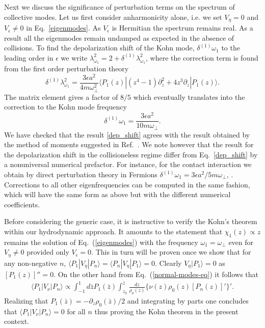 Next we discuss the significance of perturbation terms on the spectrum of collective modes. Let us first consider anharmonicity alone, i.e. we set $V_{\eta}=0$ and $V_{\epsilon}\neq 0$ in Eq.~\eqref{eigenmodes}. As $V_{\epsilon}$ is Hermitian the spectrum remains real.
As a result all the eigenmodes remain undamped as expected in the absence of collisions.
To find the depolarization shift of the Kohn mode, $\delta^{(1)} \omega_1$ to the leading order in $\epsilon$ we write $\lambda^2_{\omega_1}=2+\delta^{(1)} \lambda^2_{\omega_1}$, where the correction term is found from the first order perturbation theory 
\begin{equation}
\delta^{(1)} \lambda^2_{\omega_1}=\frac{3\epsilon a^2}{4m\omega^2_\perp}\langle P_1(z)|(z^4-1)\partial^2_z+4z^3\partial_z|P_1(z)\rangle.
\end{equation}
The matrix element gives a factor of $8/5$ which eventually translates into the correction to the Kohn mode frequency 
\begin{equation}\label{dep_shift}
\delta^{(1)}\omega_1=\frac{3\epsilon a^2}{10m\omega_\perp}.
\end{equation}
We have checked that the result \eqref{dep_shift} agrees with the result obtained by the method of moments suggested in Ref.~\cite{Pantel2012}. We note however that the result for the depolarization shift in the collisioneless regime differ from Eq.~\eqref{dep_shift} by a nonuniversal numerical prefactor. 
For instance, for the contact interaction we obtain by direct perturbation theory in Fermions $\delta^{(1)}\omega_1=3\epsilon a^2/5m\omega_\perp$, \cite{Iqbal2}. Corrections to all other eigenfrequencies can be computed in the same fashion, which will have the same form as above but with the different numerical coefficients. 

Before considering the generic case, it is instructive to verify the Kohn's theorem within our hydrodynamic approach. It amounts to the statement that $\chi_1(z) \propto z$ remains the solution of Eq.~(\ref{eigenmodes}) with the frequency $\omega_1 = \omega_{\perp}$ even for $V_{\eta} \neq 0$ provided only $V_{\epsilon}=0$. This in turn will be proven once we show that for any non-negative $n$, $\langle P_1  | V_{\eta} | P_n \rangle = \langle P_n  | V_{\eta} | P_1 \rangle =0$. Clearly $V_{\eta} | P_1 \rangle =0$ as $[P_1(z)]''=0$. On the other hand from Eq.~(\ref{normal-modes-eq}) it follows that 
\begin{align}
\!\!\!\langle P_1|V_\nu| P_n\rangle \!\!\propto\!\!\int^{1}_{-1}\!\!\!\!d\bar{z} P_1(\bar{z})\!\!\! \int^{\bar{z}}_{z_0}\!\!\frac{dz}{\rho_0(z)}\{\nu(z) \rho_0(z) [P_n(z)]'\}'.
\end{align}
Realizing that $P_1(\bar{z})=-\partial_z \rho_0(\bar{z})/2$ and integrating by parts one concludes that $\langle P_1|V_\nu| P_n\rangle=0$ for all $n$ thus proving the Kohn theorem in the present context.

